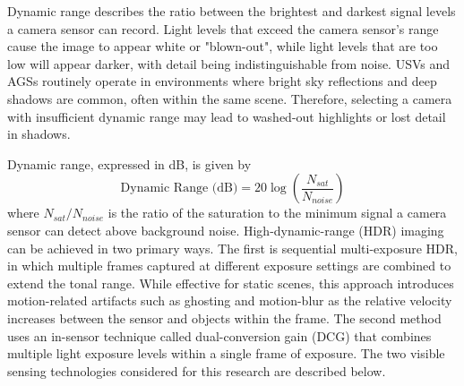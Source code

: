 \documentclass{erauthesis}
\begin{document}



Dynamic range describes the ratio between the brightest and darkest signal levels a camera sensor can record.
Light levels that exceed the camera sensor's range cause the image to appear white or "blown-out", while light levels that are too low will appear darker, with detail being indistinguishable from noise.
\acp{USV} and \acp{AGS} routinely operate in environments where bright sky reflections and deep shadows are common, often within the same scene.
Therefore, selecting a camera with insufficient dynamic range may lead to washed-out highlights or lost detail in shadows.

Dynamic range, expressed in dB, is given by
\begin{equation}
 \text{Dynamic Range (dB)} = 20 \log{\left( \frac{N_{sat}}{N_{noise}}\right) }
\end{equation}
where $N_{sat}/N_{noise}$ is the ratio of the saturation to the minimum signal a camera sensor can detect above background noise.
High-dynamic-range (HDR) imaging can be achieved in two primary ways. 
The first is sequential multi-exposure \ac{HDR}, in which multiple frames captured at different exposure settings are combined to extend the tonal range. 
While effective for static scenes, this approach introduces motion-related artifacts such as ghosting and motion-blur as the relative velocity increases between the sensor and objects within the frame.
The second method uses an in-sensor technique called dual-conversion gain (DCG) that combines multiple light exposure levels within a single frame of exposure. 
The two visible sensing technologies considered for this research are described below.
\end{document}
